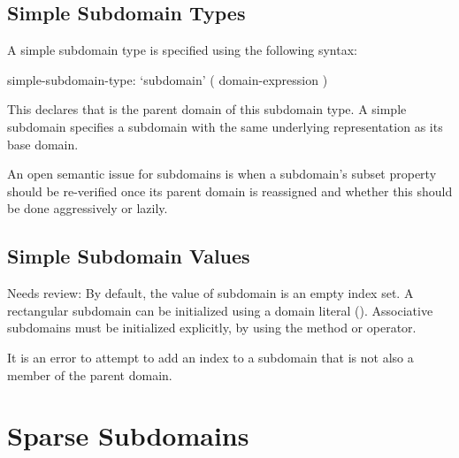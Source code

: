 \subsection{Simple Subdomain Types}
\label{Simple_Subdomain_Types}

A simple subdomain type is specified using the following syntax:
\begin{syntax}
simple-subdomain-type:
  `subdomain' ( domain-expression )
\end{syntax}

This declares that  is the parent domain of
this subdomain type.  A simple subdomain specifies a subdomain
with the same underlying representation as its base domain.  

\begin{openissue}

An open semantic issue for subdomains is when a subdomain's subset
property should be re-verified once its parent domain is reassigned
and whether this should be done aggressively or lazily.

\end{openissue}

\subsection{Simple Subdomain Values}


\begin{openissue}
Needs review:  By default, the value of subdomain is an empty index set.  A rectangular subdomain
can be initialized using a domain literal ().
Associative subdomains must be initialized explicitly, by using the 
method or \chpl{+} operator.

It is an error to attempt to add an index to a subdomain that is not also
a member of the parent domain.

\end{openissue}
\section{Sparse Subdomains}
\label{Sparse_Subdomains}

